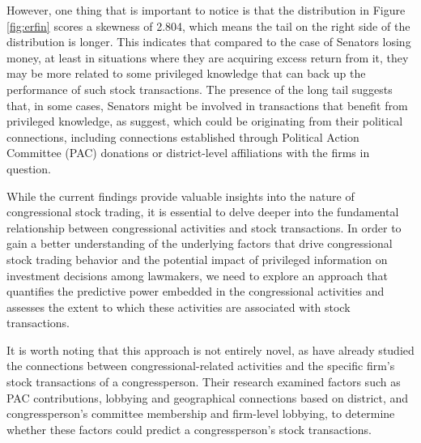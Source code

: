 \documentclass[15pt,letterpaper]{article}
\begin{document}
However, one thing that is important to notice is that the distribution in Figure \ref{fig:erfin} scores a skewness of 2.804, which means the tail on the right side of the distribution is longer. This indicates that compared to the case of Senators losing money, at least in situations where they are acquiring excess return from it, they may be more related to some privileged knowledge that can back up the performance of such stock transactions. The presence of the long tail suggests that, in some cases, Senators might be involved in transactions that benefit from privileged knowledge, as \cite{eg14} suggest, which could be originating from their political connections, including connections established through Political Action Committee (PAC) donations or district-level affiliations with the firms in question.


While the current findings provide valuable insights into the nature of congressional stock trading, it is essential to delve deeper into the fundamental relationship between congressional activities and stock transactions. In order to gain a better understanding of the underlying factors that drive congressional stock trading behavior and the potential impact of privileged information on investment decisions among lawmakers, we need to explore an approach that quantifies the predictive power embedded in the congressional activities and assesses the extent to which these activities are associated with stock transactions.

It is worth noting that this approach is not entirely novel, as \cite{eg14} have already studied the connections between congressional-related activities and the specific firm's stock transactions of a congressperson. Their research examined factors such as PAC contributions, lobbying and geographical connections based on district, and congressperson's committee membership and firm-level lobbying, to determine whether these factors could predict a congressperson's stock transactions.
\end{document}
